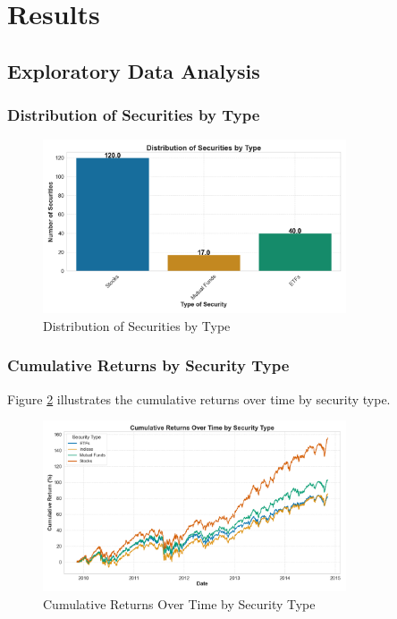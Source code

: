 \section{Results}
\subsection{Exploratory Data Analysis}

\subsubsection{Distribution of Securities by Type}

\begin{figure}[!htbp]
    \centering
    \includegraphics[width=0.8\textwidth]{../Figures/histogram_security_count.png}
    \caption{Distribution of Securities by Type}
    \label{fig:distribution_of_securities}
\end{figure}

\subsubsection{Cumulative Returns by Security Type}
Figure \ref{fig:cumulative_returns_by_type} illustrates the cumulative returns over time by security type.

\begin{figure}[!htbp]
    \centering
    \includegraphics[width=0.8\textwidth]{../Figures/cumulative_returns_by_type.png}
    \caption{Cumulative Returns Over Time by Security Type}
    \label{fig:cumulative_returns_by_type}
\end{figure}

